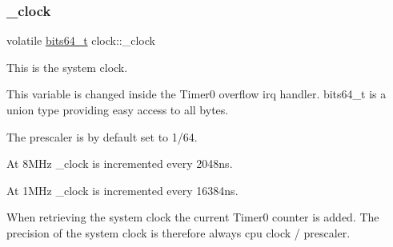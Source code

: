 \subsubsection{\texorpdfstring{\+\_\+clock}{\_clock}}
{\footnotesize\ttfamily volatile \hyperlink{unionbits64__s}{bits64\+\_\+t} clock\+::\+\_\+clock}



This is the system clock. 

This variable is changed inside the {\ttfamily Timer0} overflow irq handler. {\ttfamily bits64\+\_\+t} is a union type providing easy access to all bytes.

The prescaler is by default set to 1/64.
\begin{DoxyItemize}
\item At 8\+M\+Hz \+\_\+clock is incremented every 2\textquotesingle{}048ns.
\item At 1\+M\+Hz \+\_\+clock is incremented every 16\textquotesingle{}384ns.
\end{DoxyItemize}

When retrieving the system clock the current {\ttfamily Timer0} counter is added. The precision of the system clock is therefore always cpu clock / prescaler. 